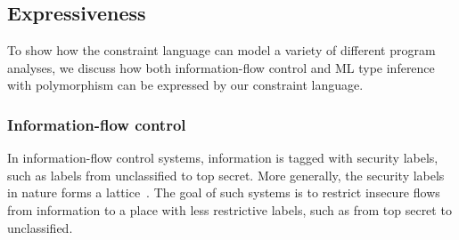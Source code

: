\subsection{Expressiveness}


To show how the constraint language can model a variety of different
program analyses, we discuss how both information-flow control and ML
type inference with polymorphism can be expressed by our constraint
language.

\subsubsection{Information-flow control}


% 
% 
% 
% 

In information-flow control systems, information is tagged with security
labels, such as labels from unclassified to top secret. More generally, the
security labels in nature forms a lattice~\cite{denning-lattice}. The goal of
such systems is to restrict insecure flows from information to a place with
less restrictive labels, such as from top secret to unclassified. 

